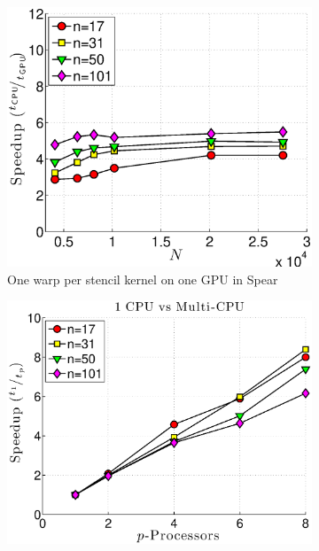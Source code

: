\begin{figure}[htbp]
\centering
\begin{subfigure}[b]{0.425\textwidth}
\includegraphics[width=1.0\textwidth]{../figures/spear_results/alltoallv/speedup_1proc_oneWarpPerStencil.eps}
\caption{One warp per stencil kernel on one GPU in Spear}
\label{fig:alltoall_1proc_warp}
\end{subfigure} 
\begin{subfigure}[b]{0.425\textwidth}
\centering
\includegraphics[width=1.0\textwidth]{../figures/spear_results/alltoallv/speedup_1CPU_vs_NCPU.eps}

\end{subfigure}
\end{figure}

